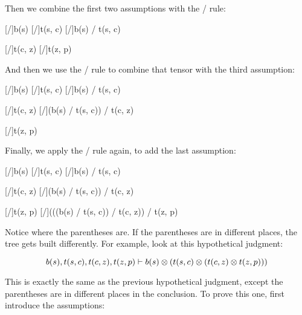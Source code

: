 \documentclass[../../../main.tex]{subfiles}
\begin{document}
\noindent
Then we combine the first two assumptions with the \tensorIntro/ rule:

\begin{prooftree*}
  \hypo{}
  [\startrule/]{b(s)}
  \hypo{}
  [\startrule/]{t(s, c)}
  [\tensorIntro/]{b(s) \tensor/ t(s, c)}

  \hypo{}
  [\startrule/]{t(c, z)}
  \hypo{}
  [\startrule/]{t(z, p)}
  
\end{prooftree*}

\noindent
And then we use the \tensorIntro/ rule to combine that tensor with the third assumption:

\begin{prooftree*}
  \hypo{}
  [\startrule/]{b(s)}
  \hypo{}
  [\startrule/]{t(s, c)}
  [\tensorIntro/]{b(s) \tensor/ t(s, c)}

  \hypo{}
  [\startrule/]{t(c, z)}
  [\tensorIntro/]{(b(s) \tensor/ t(s, c)) \tensor/ t(c, z)}

  \hypo{}
  [\startrule/]{t(z, p)}

\end{prooftree*}

\noindent
Finally, we apply the \tensorIntro/ rule again, to add the last assumption:

\begin{prooftree*}
  \hypo{}
  [\startrule/]{b(s)}
  \hypo{}
  [\startrule/]{t(s, c)}
  [\tensorIntro/]{b(s) \tensor/ t(s, c)}

  \hypo{}
  [\startrule/]{t(c, z)}
  [\tensorIntro/]{(b(s) \tensor/ t(s, c)) \tensor/ t(c, z)}

  \hypo{}
  [\startrule/]{t(z, p)}
  [\tensorIntro/]{(((b(s) \tensor/ t(s, c)) \tensor/ t(c, z)) \tensor/ t(z, p)}
\end{prooftree*}

\noindent
Notice where the parentheses are. If the parentheses are in different places, the tree gets built differently. For example, look at this hypothetical judgment:

\begin{equation*}
  b(s), t(s, c), t(c, z), t(z, p) \ndturnstile/ b(s) \tensor/ (t(s, c) \tensor/ (t(c, z) \tensor/ t(z, p)))
\end{equation*}

\noindent
This is exactly the same as the previous hypothetical judgment, except the parentheses are in different places in the conclusion. To prove this one, first introduce the assumptions:
\end{document}
